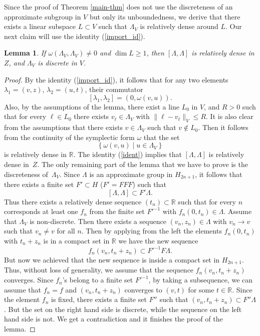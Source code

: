 \documentclass[JEP,XML,SOM,Unicode,NoEqCountersInSection]{cedram}
\newcommand{\bR}{\mathbb{R}}
\newcounter{dummy} \numberwithin{dummy}{section}
\theoremstyle{plain}
\newtheorem{lemma}[dummy]{Lemma}
\theoremstyle{definition}
\begin{document}
Since the proof of Theorem \ref{main-thm} does not use the discreteness of an approximate subgroup in $V$ but only its unboundedness, we derive that there exists a linear subspace $L \subset V$ such that $\Lambda_V$ is relatively dense around $L$. Our next claim will use the identity (\ref{import_id}).

\begin{lemma}
\label{lem2}
If $\omega(\Lambda_V,\Lambda_V) \neq 0$ and $\dim L \ge 1$, then $[\Lambda,\Lambda]$ is relatively dense in $Z$, and $\Lambda_V$ is discrete in $V$.
\end{lemma}
\begin{proof}
By the identity (\ref{import_id}), it follows that for any two elements $\lambda_1 = (v,z)$, $\lambda_2 = (u,t)$, their commutator
\begin{equation}
\label{ident}
[\lambda_1,\lambda_2] = (0, \omega(v,u)).
\end{equation}
Also, by the assumptions of the lemma, there exist a line $L_0$ in $V$, and $R > 0$ such that for every $\ell \in L_0$ there exists $v_{\ell} \in \Lambda_V$ with $\| \ell - v_{\ell} \|_{V} \le R$. It is also clear from the assumptions that there exists $v \in \Lambda_V$ such that $v \not \in L_0$. Then it follows from the continuity of the symplectic form $\omega$ that the set
\[
\left\{ \omega(v,u) \mid u \in \Lambda_V \right\}
\]
is relatively dense in $\bR$. The identity (\ref{ident}) implies that $[\Lambda,\Lambda]$ is relatively dense in~$Z$.
The only remaining part of the lemma that we have to prove is the discreteness of~$\Lambda_V$.
Since $\Lambda$ is an approximate group in $H_{2n+1}$, it follows that there exists a finite set $F' \subset H$ ($F' = F F F$) such that
\[
[\Lambda,\Lambda] \subset F' \Lambda.
\]
Thus there exists a relatively dense sequence $(t_n) \subset \bR$ such that for every $n$ corresponds at least one
$f_n$ from the finite set $F'^{-1}$ with $f_n(0,t_n) \in \Lambda$.
Assume that $\Lambda_V$ is non-discrete. Then there exists a sequence $(v_n,z_n) \in \Lambda$ with $v_n \to v$ such that $v_n \neq v$ for all $n$. Then by applying from the left the elements $f_n (0,t_n)$ with $t_n+z_n$ is in a compact set in $\bR$ we have the new sequence
\[
f_n (v_n, t_n+z_n) \subset F'^{-1}F \Lambda.
\]
But now we achieved that the new sequence is inside a compact set in $H_{2n+1}$. Thus, without loss of generality, we assume that the sequence $f_n (v_n, t_n + z_n)$ converges.
Since $f_n$'s belong to a finite set $F'^{-1}$, by taking a subsequence, we can assume that $f_n = f$ and $(v_n,t_n+z_n)$ converges to $(v,t)$ for some $t \in \bR$. Since the element $f_n$ is fixed, there exists a finite set $F''$ such that $(v_n,t_n+z_n) \subset F'' \Lambda$. But the set on the right hand side is discrete, while the sequence on the left hand side is not. We get a contradiction and it finishes the proof of the lemma.
\end{proof}
\end{document}
